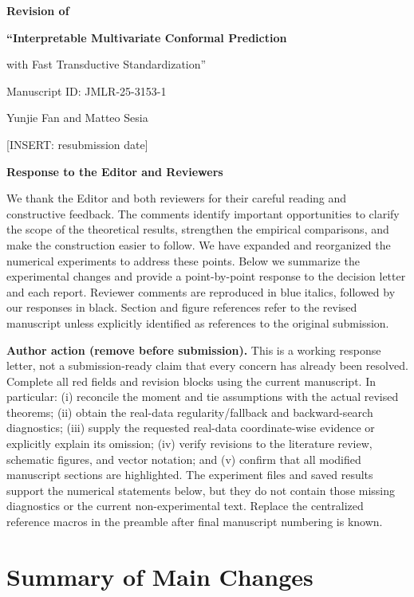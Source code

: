 \documentclass[11pt]{article}
\numberwithin{equation}{section}
\newcommand{\pending}[1]{\textcolor{AuthorRed}{[INSERT: #1]}}
\newcommand{\authoraction}[1]{%
  \par\begingroup\small\color{AuthorRed}%
  \textbf{Author action (remove before submission).} #1\par\endgroup}
\begin{document}
\begin{center}
  {\Large\bfseries Revision of\par}
  \vspace{0.4em}
  {\Large\bfseries ``Interpretable Multivariate Conformal Prediction\par
  with Fast Transductive Standardization''\par}
  \vspace{0.8em}
  Manuscript ID: JMLR-25-3153-1\par
  Yunjie Fan and Matteo Sesia\par
  \pending{resubmission date}\par
  \vspace{0.8em}
  {\large\bfseries Response to the Editor and Reviewers}
\end{center}

We thank the Editor and both reviewers for their careful reading and
constructive feedback. The comments identify important opportunities to
clarify the scope of the theoretical results, strengthen the empirical
comparisons, and make the construction easier to follow. We have expanded
and reorganized the numerical experiments to address these points. Below
we summarize the experimental changes and provide a point-by-point response
to the decision letter and each report. Reviewer comments are reproduced
in blue italics, followed by our responses in black. Section and figure
references refer to the revised manuscript unless explicitly identified as
references to the original submission.

\authoraction{This is a working response letter, not a submission-ready
claim that every concern has already been resolved. Complete all red fields
and revision blocks using the current manuscript. In particular:
(i) reconcile the moment and tie assumptions with the actual revised
theorems; (ii) obtain the real-data regularity/fallback and backward-search
diagnostics; (iii) supply the requested real-data coordinate-wise evidence
or explicitly explain its omission; (iv) verify revisions to the literature
review, schematic figures, and vector notation; and (v) confirm that all
modified manuscript sections are highlighted. The experiment files and
saved results support the numerical statements below, but they do not
contain those missing diagnostics or the current non-experimental text.
Replace the centralized reference macros in the preamble after final
manuscript numbering is known.}

\section{Summary of Main Changes}
\label{sec:summary}
\end{document}
